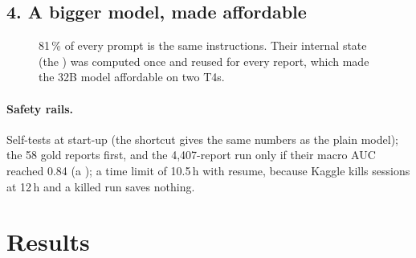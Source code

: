 \subsection*{4. A bigger model, made affordable}

\begin{figure}[H]
\centering
{}
\caption{81\,\% of every prompt is the same instructions. Their internal state (the ) was computed
once and reused for every report, which made the 32B model affordable on two T4s.}
\end{figure}

\paragraph{Safety rails.} Self-tests at start-up (the shortcut gives the same numbers as the plain model); the
58 gold reports first, and the 4,407-report run only if their macro AUC reached 0.84 (a ); a time
limit of 10.5\,h with resume, because Kaggle kills sessions at 12\,h and a killed run saves nothing.

\section{Results}

